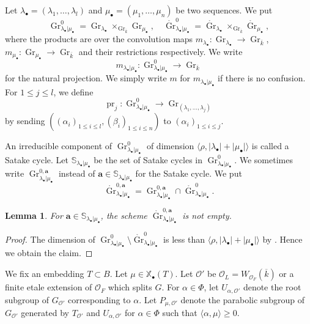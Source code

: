 \documentclass[12pt,a4paper]{article}
\newtheorem{lem}[thm]{Lemma}
\DeclareMathOperator{\pr}{pr}
\DeclareMathOperator{\Gr}{Gr}
\newcommand{\bS}{\mathbb{S}}
\newcommand{\bX}{\mathbb{X}}
\newcommand{\bfa}{\mathbf{a}}
\newcommand{\cO}{\mathcal{O}}
\newcommand{\ol}{\overline}
\begin{document}
Let $\lambda_{\bullet}=(\lambda_1, \ldots, \lambda_l)$ and 
$\mu_{\bullet}=(\mu_1, \ldots, \mu_n)$ be two sequences. 
We put 
\[
 \Gr^0_{\lambda_\bullet | \mu_{\bullet}} = \Gr_{\lambda_{\bullet} }  \times_{\Gr_{\ol{k}}} 
 \Gr_{\mu_{\bullet} }, \quad 
 \mathring{\Gr}^0_{\lambda_\bullet | \mu_{\bullet}} = \mathring{\Gr}_{\lambda_{\bullet} }  \times_{\Gr_{\ol{k}}} 
 \mathring{\Gr}_{\mu_{\bullet} }, 
\]
where the products are over the convolution maps $m_{\lambda_{\bullet}} \colon \Gr_{\lambda_{\bullet} } \rightarrow \Gr_{\ol{k}}$, $m_{\mu_{\bullet}} \colon \Gr_{\mu_{\bullet} } \rightarrow \Gr_{\ol{k}}$ and their restrictions respectively. 
We write 
\[
 m_{\lambda_\bullet | \mu_{\bullet}} \colon 
 \Gr^0_{\lambda_\bullet | \mu_{\bullet}} \to \Gr_{\ol{k}} 
\]
for the natural projection. 
We simply write $m$ for $m_{\lambda_\bullet | \mu_{\bullet}}$ if there is no confusion.  
For $1 \leq j \leq l$, we define 
\[
 \pr_j \colon \Gr^0_{\lambda_\bullet | \mu_{\bullet}} \to 
 \Gr_{(\lambda_1,\ldots,\lambda_j)} 
\]
by sending $((\alpha_i)_{1 \leq i \leq l},(\beta_i)_{1 \leq i \leq n})$ 
to $(\alpha_i)_{1 \leq i \leq j}$. 

An irreducible component of 
$\Gr^0_{\lambda_{\bullet} | \mu_{\bullet}}$ 
of dimension $\langle \rho , \lvert \lambda_{\bullet} \rvert +\lvert \mu_{\bullet} \rvert \rangle$ 
is called a Satake cycle. 
Let $\bS_{\lambda_\bullet | \mu_{\bullet}}$ 
be the set of Satake cycles in 
$\Gr^0_{\lambda_\bullet | \mu_{\bullet}}$. 
We sometimes write 
$\Gr^{0,\bfa}_{\lambda_\bullet | \mu_{\bullet}}$ instead of $\bfa \in \bS_{\lambda_\bullet | \mu_{\bullet}}$ 
for the Satake cycle. 
We put 
\[
 \mathring{\Gr}^{0,\bfa}_{\lambda_\bullet | \mu_{\bullet}} = 
 \Gr^{0,\bfa}_{\lambda_\bullet | \mu_{\bullet}} \cap 
 \mathring{\Gr}^0_{\lambda_\bullet | \mu_{\bullet}}. 
\]
\begin{lem}\label{lem:SatCyCl}
For $\bfa \in \bS_{\lambda_\bullet | \mu_{\bullet}}$, the scheme 
$\mathring{\Gr}^{0,\bfa}_{\lambda_\bullet | \mu_{\bullet}}$ 
is not empty. 
\end{lem}
\begin{proof}
The dimension of 
$\Gr^0_{\lambda_\bullet | \mu_{\bullet}} \setminus \mathring{\Gr}^0_{\lambda_\bullet | \mu_{\bullet}}$ 
is less than $\langle \rho , \lvert \lambda_{\bullet} \rvert +\lvert \mu_{\bullet} \rvert \rangle$ by \cite[Proposition 3.1.10 (1)]{XiZhCycSh}. Hence we obtain the claim. 
\end{proof}

We fix an embedding 
$T \subset B$. Let $\mu \in \bX_{\bullet}( T)$. 
Let $\cO'$ be $\cO_L=W_{\cO_F}(\ol{k})$ or a finite etale extension of $\cO_F$ 
which splits $G$. 
For $\alpha \in \Phi$, let $U_{\alpha,\cO'}$ denote the root subgroup of 
$G_{\cO'}$ corresponding to $\alpha$. 
Let $P_{\mu,\cO'}$ denote the parabolic subgroup of 
$G_{\cO'}$ generated by $T_{\cO'}$ and $U_{\alpha,\cO'}$ for 
$\alpha \in \Phi$ such that $\langle \alpha , \mu \rangle \geq 0$. 
\end{document}
